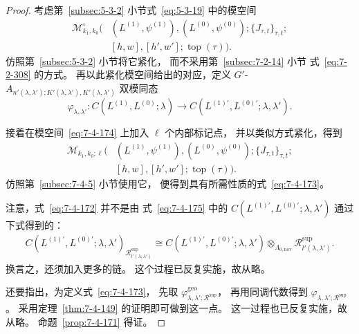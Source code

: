 \begin{proof}
考虑第~\ref{subsec:5-3-2} 小节式~\eqref{eq:5-3-19}
中的模空间
\begin{equation}
\begin{aligned}
\mathcal M^\circ_{k_1,k_0}
\bigl(&
(L^{(1)},\psi^{(1)}),
(L^{(0)},\psi^{(0)});
\{J_{\tau,t}\}_{\tau,t};\\[-.2em]
&[h,w],[h',w'];\operatorname{top}(\tau)
\bigr).
\end{aligned}
\tag{7.4.174}\label{eq:7-4-174}
\end{equation}
仿照第~\ref{subsec:5-3-2} 小节将它紧化，
而不采用第~\ref{subsec:7-2-14} 小节
式~\eqref{eq:7-2-308} 的方式。
再以此紧化模空间给出的对应，定义
$G'$-$A_{n'(\lambda,\lambda');
K'(\lambda,\lambda'),K'(\lambda,\lambda')}$ 双模同态
\begin{equation}
\varphi_{\lambda,\lambda'}\colon
C(L^{(1)},L^{(0)};\lambda)
\longrightarrow
C(L^{(1)\prime},L^{(0)\prime};\lambda,\lambda').
\tag{7.4.175}\label{eq:7-4-175}
\end{equation}

接着在模空间~\eqref{eq:7-4-174}
上加入 $\ell$ 个内部标记点，
并以类似方式紧化，得到
\begin{equation}
\begin{aligned}
\mathcal M_{k_1,k_0;\ell}
\bigl(&
(L^{(1)},\psi^{(1)}),
(L^{(0)},\psi^{(0)});
\{J_{\tau,t}\}_{\tau,t};\\[-.2em]
&[h,w],[h',w'];\operatorname{top}(\tau)
\bigr).
\end{aligned}
\tag{7.4.176}\label{eq:7-4-176}
\end{equation}
仿照第~\ref{subsec:7-4-5} 小节使用它，
便得到具有所需性质的式~\eqref{eq:7-4-173}。

注意，式~\eqref{eq:7-4-172} 并不是由
式~\eqref{eq:7-4-175} 中的
$C(L^{(1)\prime},L^{(0)\prime};\lambda,\lambda')$
通过下式得到的：
\[
\begin{aligned}
C(L^{(1)\prime},L^{(0)\prime};\lambda,\lambda')_
{\mathcal R^{\mathrm{sup}}_{l'(\lambda,\lambda')}}
\cong
C(L^{(1)\prime},L^{(0)\prime};\lambda,\lambda')
\otimes_{\Lambda_{0,\mathrm{nov}}}
\mathcal R^{\mathrm{sup}}_{l'(\lambda,\lambda')}.
\end{aligned}
\]
换言之，还须加入更多的链。
这个过程已反复实施，故从略。

还要指出，为定义式~\eqref{eq:7-4-173}，
先取
$\varphi^{\mathrm{geo}}_{
\lambda,\lambda';\mathcal R^{\mathrm{sup}}}$，
再用同调代数得到
$\varphi_{
\lambda,\lambda';\mathcal R^{\mathrm{sup}}}$。
采用定理~\ref{thm:7-4-149} 的证明即可做到这一点。
这一过程也已反复实施，故从略。
命题~\ref{prop:7-4-171} 得证。
\end{proof}

